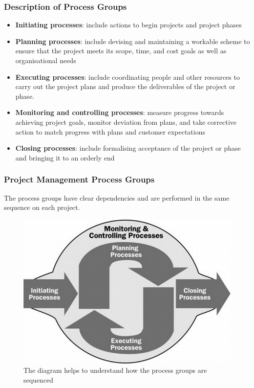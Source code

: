 \documentclass{beamer}
\begin{document}
\begin{frame}
\frametitle{Description of Process Groups}
\begin{itemize}
\item \textbf{Initiating processes}: include actions to begin projects and project phases
\item \textbf{Planning processes}: include devising and maintaining a workable scheme to ensure that the project meets its scope, time, and cost goals as well as organisational needs
\item \textbf{Executing processes}: include coordinating people and other resources to carry out the project plans and produce the deliverables of the project or phase.
\item \textbf{Monitoring and controlling processes}: measure progress towards achieving project goals, monitor deviation from plans, and take corrective action to match progress with plans and customer expectations
\item \textbf{Closing processes}: include formalising acceptance of the project or phase and bringing it to an orderly end
\end{itemize}
\end{frame}

\begin{frame}
\frametitle{Project Management Process Groups}
The process groups have clear dependencies and are performed in the same sequence on each project.
\begin{figure}
\includegraphics[scale=0.45]{process_seq}
\caption{The diagram helps to understand how the process groups are sequenced}
\end{figure}
\end{frame}
\end{document}
